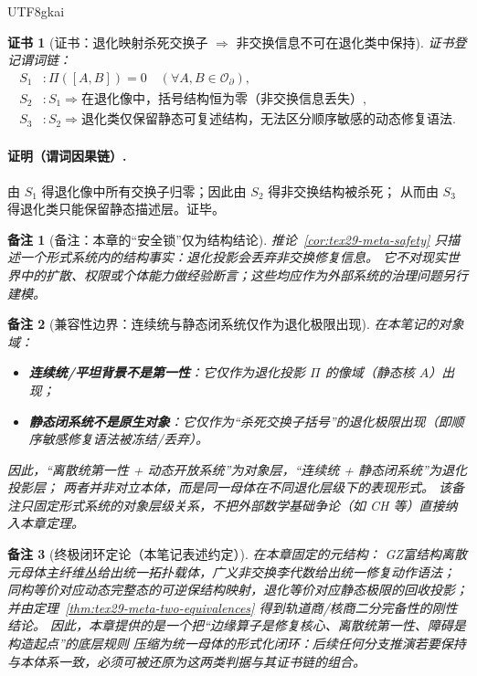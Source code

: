 \documentclass[12pt]{article}
\newtheorem{remark}{备注}[section]
\newtheorem{Certificate}{证书}[section]
\newcommand{\KouJing}{\texorpdfstring{表述约定}{表述约定}}
\newcommand{\GZMonMotherBundle}{\texorpdfstring{GZ富结构离散元母体主纤维丛}{GZ富结构离散元母体主纤维丛}}
\begin{document}
\begin{CJK*}{UTF8}{gkai}
\begin{Certificate}[证书：退化映射杀死交换子 $\Rightarrow$ 非交换信息不可在退化类中保持]
\label{cert:tex29-meta-safety}
证书登记谓词链：
\[
\begin{aligned}
  S_1 &: \Pi([A,B])=0\quad(\forall A,B\in\mathcal{O}_{\partial}),\\
  S_2 &: S_1\Rightarrow \text{在退化像中，括号结构恒为零（非交换信息丢失）},\\
  S_3 &: S_2\Rightarrow \text{退化类仅保留静态可复述结构，无法区分顺序敏感的动态修复语法}.
\end{aligned}
\]
\end{Certificate}

\paragraph{证明（谓词因果链）.}
由 $S_1$ 得退化像中所有交换子归零；因此由 $S_2$ 得非交换结构被杀死；
从而由 $S_3$ 得退化类只能保留静态描述层。证毕。

\begin{remark}[备注：本章的“安全锁”仅为结构结论]
推论~\ref{cor:tex29-meta-safety} 只描述一个形式系统内的结构事实：退化投影会丢弃非交换修复信息。
它不对现实世界中的扩散、权限或个体能力做经验断言；这些均应作为外部系统的治理问题另行建模。
\end{remark}

\begin{remark}[兼容性边界：连续统与静态闭系统仅作为退化极限出现]
在本笔记的对象域：
\begin{itemize}
  \item \textbf{连续统/平坦背景不是第一性}：它仅作为退化投影 $\Pi$ 的像域（静态核 $A$）出现；
  \item \textbf{静态闭系统不是原生对象}：它仅作为“杀死交换子括号”的退化极限出现（即顺序敏感修复语法被冻结/丢弃）。
\end{itemize}
因此，“离散统第一性 + 动态开放系统”为对象层，“连续统 + 静态闭系统”为退化投影层；
两者并非对立本体，而是同一母体在不同退化层级下的表现形式。
该备注只固定形式系统的对象层级关系，不把外部数学基础争论（如 CH 等）直接纳入本章定理。
\end{remark}

\begin{remark}[终极闭环定论（本笔记\KouJing）]
在本章固定的元结构：
\GZMonMotherBundle{}给出统一拓扑载体，广义非交换李代数给出统一修复动作语法；
同构等价对应动态完整态的可逆保结构映射，退化等价对应静态极限的回收投影；
并由定理~\ref{thm:tex29-meta-two-equivalences} 得到轨道商/核商二分完备性的刚性结论。
因此，本章提供的是一个把“边缘算子是修复核心、离散统第一性、障碍是构造起点”的底层规则
压缩为统一母体的形式化闭环：后续任何分支推演若要保持与本体系一致，必须可被还原为这两类判据与其证书链的组合。
\end{remark}


\end{CJK*}
\end{document}
